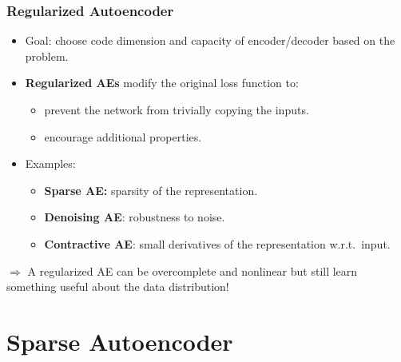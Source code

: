 \documentclass[11pt,compress,t,notes=noshow, xcolor=table]{beamer}
\begin{document}
  \begin{frame}

  \frametitle{Regularized Autoencoder}
  
 
    \begin{itemize}
       \item Goal: choose code dimension and capacity of encoder/decoder based on the problem.
       \item \textbf{Regularized AEs} modify the original loss function to:
       \begin{itemize}
       \item prevent the network from trivially copying the inputs.
       \item encourage additional properties.
       \end{itemize}
       
     
        \item Examples:
            \begin{itemize}
                \item \textbf{Sparse AE:} sparsity of the representation.
                \item \textbf{Denoising AE}: robustness to noise.%
                \item \textbf{Contractive AE}: small derivatives of the representation w.r.t.~input.
            \end{itemize}
   
    \end{itemize} 
    $\Rightarrow$ 
    A regularized AE can be overcomplete and nonlinear but still learn something useful about the data distribution!  
  
  
\end{frame}


\section{Sparse Autoencoder}
\end{document}
